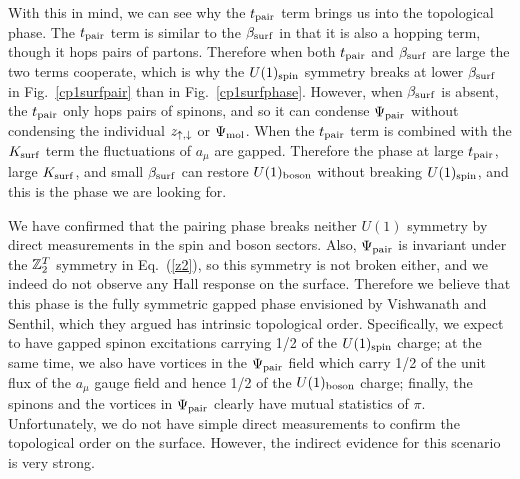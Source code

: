 With this in mind, we can see why the $t_{\rm pair}$ term brings us into the topological phase. The $t_{\rm pair}$ term is similar to the $\beta_{\rm surf}$ in that it is also a hopping term, though it hops pairs of partons. Therefore when both $t_{\rm pair}$ and $\beta_{\rm surf}$ are large the two terms cooperate, which is why the $U(1)_{\rm spin}$ symmetry breaks at lower $\beta_{\rm surf}$ in Fig.~\ref{cp1surfpair} than in Fig.~\ref{cp1surfphase}. However, when $\beta_{\rm surf}$ is absent, the $t_{\rm pair}$ only hops pairs of spinons, and so it can condense $\Psi_{\rm pair}$ without condensing the individual $z_{\uparrow,\downarrow}$ or $\Psi_{\rm mol}$. When the $t_{\rm pair}$ term is combined with the $K_{\rm surf}$ term the fluctuations of $a_\mu$ are gapped. Therefore the phase at large $t_{\rm pair}$, large $K_{\rm surf}$, and small $\beta_{\rm surf}$ can restore $U(1)_{\rm boson}$ without breaking $U(1)_{\rm spin}$, and this is the phase we are looking for.

We have confirmed that the pairing phase breaks neither $U(1)$ symmetry by direct measurements in the spin and boson sectors.  Also,  $\Psi_{\rm pair}$ is invariant under the $\mathbb{Z}_2^T$ symmetry in Eq.~(\ref{z2}), so this symmetry is not broken either, and we indeed do not observe any Hall response on the surface.  Therefore we believe that this phase is the fully symmetric gapped phase envisioned by Vishwanath and Senthil, which they argued has intrinsic topological order.  Specifically, we expect to have gapped spinon excitations carrying 1/2 of the $U(1)_{\rm spin}$ charge; at the same time, we also have vortices in the $\Psi_{\rm pair}$ field which carry 1/2 of the unit flux of the $a_\mu$ gauge field and hence 1/2 of the $U(1)_{\rm boson}$ charge; finally, the spinons and the vortices in $\Psi_{\rm pair}$ clearly have mutual statistics of $\pi$.  Unfortunately, we do not have simple direct measurements to confirm the topological order on the surface.  However, the indirect evidence for this scenario is very strong.

